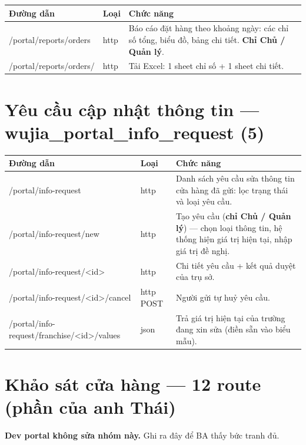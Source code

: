 \documentclass[11pt,a4paper]{report}
\newcommand{\rt}[1]{{\ttfamily\footnotesize #1}}
\begin{document}
{\small
\begin{longtable}{@{}L{5.4cm}L{1.5cm}L{7.5cm}@{}}
\toprule
\textbf{Đường dẫn} & \textbf{Loại} & \textbf{Chức năng} \\
\midrule
\endhead
\rt{/portal/reports/orders} & http & Báo cáo đặt hàng theo khoảng ngày: các chỉ số tổng, biểu đồ, bảng chi tiết. \textbf{Chỉ Chủ / Quản lý}. \\
\rt{/portal/reports/orders/}\allowbreak\rt{export.xlsx} & http & Tải Excel: 1 sheet chỉ số + 1 sheet chi tiết. \\
\bottomrule
\end{longtable}}

\section{Yêu cầu cập nhật thông tin --- \rt{wujia\_portal\_info\_request} (5)}

{\small
\begin{longtable}{@{}L{5.4cm}L{1.5cm}L{7.5cm}@{}}
\toprule
\textbf{Đường dẫn} & \textbf{Loại} & \textbf{Chức năng} \\
\midrule
\endhead
\rt{/portal/info-request} & http & Danh sách yêu cầu sửa thông tin cửa hàng đã gửi: lọc trạng thái và loại yêu cầu. \\
\rt{/portal/info-request/new} & http & Tạo yêu cầu (\textbf{chỉ Chủ / Quản lý}) — chọn loại thông tin, hệ thống hiện giá trị hiện tại, nhập giá trị đề nghị. \\
\rt{/portal/info-request/<id>} & http & Chi tiết yêu cầu + kết quả duyệt của trụ sở. \\
\rt{/portal/info-request/<id>/cancel} & http POST & Người gửi tự huỷ yêu cầu. \\
\rt{/portal/info-request/franchise/<id>/values} & json & Trả giá trị hiện tại của trường đang xin sửa (điền sẵn vào biểu mẫu). \\
\bottomrule
\end{longtable}}

\section{Khảo sát cửa hàng --- 12 route (phần của anh Thái)}

\textbf{Dev portal không sửa nhóm này.} Ghi ra đây để BA thấy bức tranh đủ.
\end{document}
